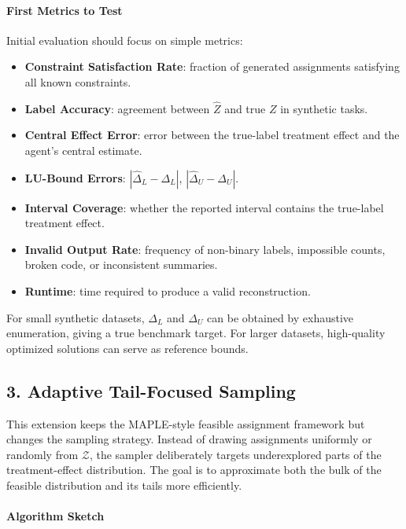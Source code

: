 \documentclass[11pt]{article}
\begin{document}
\paragraph*{First Metrics to Test}

Initial evaluation should focus on simple metrics:

\begin{itemize}
\item \textbf{Constraint Satisfaction Rate}: fraction of generated assignments satisfying all known constraints.
\item \textbf{Label Accuracy}: agreement between \(\hat Z\) and true \(Z\) in synthetic tasks.
\item \textbf{Central Effect Error}: error between the true-label treatment effect and the agent's central estimate.
\item \textbf{LU-Bound Errors}: \(|\hat\Delta_L-\Delta_L|\), \(|\hat\Delta_U-\Delta_U|\).
\item \textbf{Interval Coverage}: whether the reported interval contains the true-label treatment effect.
\item \textbf{Invalid Output Rate}: frequency of non-binary labels, impossible counts, broken code, or inconsistent summaries.
\item \textbf{Runtime}: time required to produce a valid reconstruction.
\end{itemize}

For small synthetic datasets, \(\Delta_L\) and \(\Delta_U\) can be obtained by exhaustive enumeration, giving a true benchmark target. For larger datasets, high-quality optimized solutions can serve as reference bounds.

\subsection*{3. Adaptive Tail-Focused Sampling}

This extension keeps the MAPLE-style feasible assignment framework but changes the sampling strategy. Instead of drawing assignments uniformly or randomly from \(\mathcal Z\), the sampler deliberately targets underexplored parts of the treatment-effect distribution.
The goal is to approximate both the bulk of the feasible distribution and its tails more efficiently.

\paragraph*{Algorithm Sketch}
\end{document}
